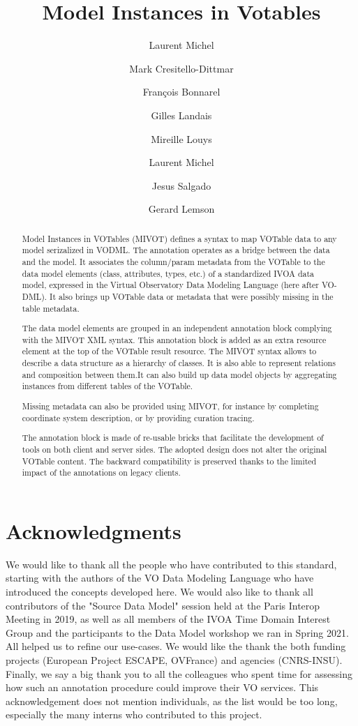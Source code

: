 \documentclass[11pt,a4paper]{ivoa}
\title{Model Instances in Votables}
\author{Laurent Michel}
\author{Mark Cresitello-Dittmar}
\author{François Bonnarel}
\author{Gilles Landais}
\author{Mireille Louys}
\author{Laurent Michel}
\author{Jesus Salgado}
\author{Gerard Lemson}
\begin{document}
\begin{abstract}
Model Instances in VOTables (MIVOT) defines a syntax to map VOTable data to any model serizalized in VODML.
The annotation operates as a bridge between the data and the model.
It associates the column/param metadata from the VOTable to the 
data model elements (class, attributes, types, etc.) of a standardized IVOA data model, expressed in the Virtual Observatory Data Modeling Language (here after VO-DML).
It also brings up VOTable data or metadata that were possibly missing in the table metadata.

The data model elements are grouped in an independent annotation block complying with the MIVOT XML syntax.
This annotation block is added as an extra resource element at the top of the VOTable result resource. 
The MIVOT syntax allows to describe a data structure as a hierarchy of classes. It is also able to represent relations and composition between them.It can also build up data model objects by aggregating instances from different tables of the VOTable.

Missing metadata can also be provided using MIVOT, for instance by completing coordinate system description, or by providing curation tracing.

The annotation block is made of re-usable bricks that facilitate the development of tools on both client and server sides.
The adopted design does not alter the original VOTable content. 
The backward compatibility is preserved thanks to the limited impact of the annotations on legacy clients.
\end{abstract}


\section*{Acknowledgments}
We would like to thank all the people who have contributed to this standard, starting with the authors of the VO Data Modeling Language who have introduced the concepts developed here.
We would also like to thank all contributors of the "Source Data Model" session held at the Paris Interop Meeting in 2019, as well as all members of the IVOA Time Domain Interest Group and the participants to the Data Model workshop we ran in Spring 2021. All helped us to refine our use-cases.
We would like the thank the both funding projects (European Project ESCAPE, OVFrance) and agencies (CNRS-INSU).
Finally, we say a big thank you to all the colleagues who spent time for assessing how such an annotation procedure could improve their VO services.
This acknowledgement does not mention individuals, as the list would be too long, especially the many interns who contributed to this project.
\end{document}
